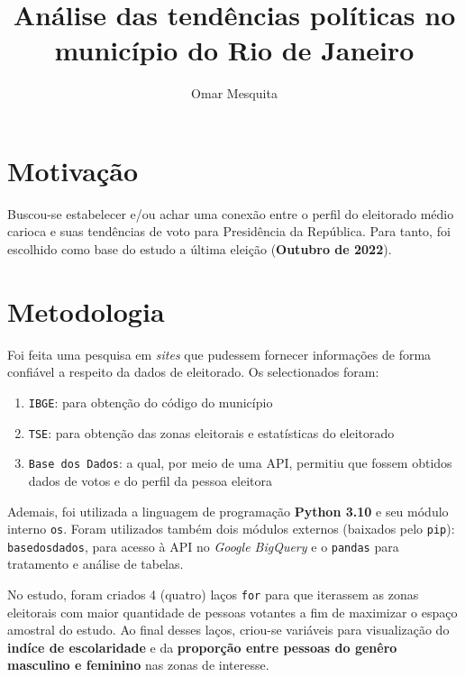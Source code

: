 \documentclass{article}
\begin{document}
 

	\title{Análise das tendências políticas no município do Rio de Janeiro}
	\author{Omar Mesquita}
	\date{} 
	\maketitle

	\section{Motivação}

	Buscou-se estabelecer e/ou achar uma conexão entre o perfil do eleitorado médio carioca e suas tendências 
	de voto para Presidência da República. Para tanto, foi escolhido como base do estudo a última eleição 
	(\textbf{Outubro de 2022}).

	\section{Metodologia} 

	Foi feita uma pesquisa em \textit{sites} que pudessem fornecer informações de forma confiável a respeito da
	dados de eleitorado. Os selectionados foram: 

	\begin{enumerate} 
		\item{\texttt{IBGE}: para obtenção do código do município}
		\item{\texttt{TSE}: para obtenção das zonas eleitorais e estatísticas do eleitorado} 
		\item{\texttt{Base dos Dados}: a qual, por meio de uma API, permitiu que fossem obtidos
			dados de votos e do perfil da pessoa eleitora}

	\end{enumerate}

	Ademais, foi utilizada a linguagem de programação \textbf{Python 3.10} e seu módulo interno \texttt{os}. 
	Foram utilizados também dois módulos externos (baixados pelo \texttt{pip}): \texttt{basedosdados}, para
	acesso à API no \textit{Google BigQuery} e o \texttt{pandas} para tratamento e análise de tabelas.


	No estudo, foram criados 4 (quatro) laços \texttt{for} para que iterassem as zonas eleitorais com maior 
	quantidade de pessoas votantes a fim de maximizar o espaço amostral do estudo. Ao final desses laços,
	criou-se variáveis para visualização do \textbf{indíce de escolaridade} e da 
	\textbf{proporção entre pessoas do genêro masculino e feminino} nas zonas de interesse.
\end{document}
